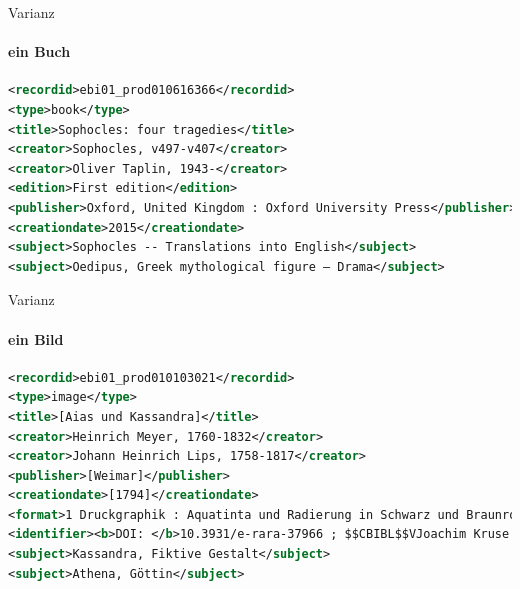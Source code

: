 

\begin{frame}[fragile]{Varianz}
  \framesubtitle{ein Buch}
  \selectfont
  \begin{lstlisting}[language=xml]
<recordid>ebi01_prod010616366</recordid>
<type>book</type>
<title>Sophocles: four tragedies</title>
<creator>Sophocles, v497-v407</creator>
<creator>Oliver Taplin, 1943-</creator>
<edition>First edition</edition>
<publisher>Oxford, United Kingdom : Oxford University Press</publisher>
<creationdate>2015</creationdate>
<subject>Sophocles -- Translations into English</subject>
<subject>Oedipus, Greek mythological figure – Drama</subject>
  \end{lstlisting}
\end{frame}

\begin{frame}[fragile]{Varianz}
  \framesubtitle{ein Bild}
  \selectfont
  \begin{lstlisting}[language=xml]
<recordid>ebi01_prod010103021</recordid>
<type>image</type>
<title>[Aias und Kassandra]</title>
<creator>Heinrich Meyer, 1760-1832</creator>
<creator>Johann Heinrich Lips, 1758-1817</creator>
<publisher>[Weimar]</publisher>
<creationdate>[1794]</creationdate>
<format>1 Druckgraphik : Aquatinta und Radierung in Schwarz und Braunrot ; Bild 18,5 x 23,1 cm, Blatt 23,4 x 32,2 cm</format>
<identifier><b>DOI: </b>10.3931/e-rara-37966 ; $$CBIBL$$VJoachim Kruse: Johann Heinrich Lips 1758-1817, Coburg 1989, S. 220 ; $$CBIBL$$VErschienen in: Heinrich Meyer/Carl August Böttiger (Hg.): Über den Raub der Cassandra auf einem alten Gefässe von gebrannter Erde, Weimar 1794, S. 93</identifier>
<subject>Kassandra, Fiktive Gestalt</subject>
<subject>Athena, Göttin</subject>
  \end{lstlisting}
\end{frame}


